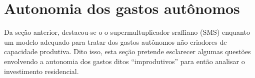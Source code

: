 \section{Autonomia dos gastos autônomos}\label{Literatura}

Da seção anterior, destacou-se o o supermultuplicador sraffiano (SMS) enquanto um modelo adequado para tratar dos gastos autônomos não criadores de capacidade produtiva.
Dito isso, esta seção pretende esclarecer algumas questões envolvendo a autonomia dos gastos ditos ``improdutivos'' para então analisar o investimento residencial.





\begin{comment}
DESCARTADOS

Além disso, a inclusão deste componente de gasto revela a resolução parcial da instabilidade harrodiana\footnote{Diferentemente de \textcite{hein_harrodian_2012}, a instabilidade harrodiana é entendida como a incapacidade das expectativas sobre o grau de utilização se ajustarem na direção correta (instabilidade fundamental nos termos de \textcite{serrano_trouble_2017}) e não como o princípio do ajuste do estoque de capital.} nos modelos kaleckianos se não forem feitas modificações adicionais\footnote{Como visto, nos modelos mais convencionais a endogeneidade do grau de utilização é suficiente para contornar esse problema. As complicações mencionadas, decorrem das sofisticações dos modelos kaleckianos.}.
Considerando, como em \textcite{amadeo_expectations_1987}, que o investimento reaja às expectativas sobre o grau de utilização ($u^e$), a função de acumulação ($g_I$) pode ser reescrita como:

\begin{equation}
\label{Kalecki_Autonomous}
g_I = \gamma + \gamma_u (u^e - u_n)
\end{equation}
em que $\gamma$ corresponde ao componente autônomo do investimento e pode ser traduzido tanto como \textit{animal spirits} quanto expectativa média da taxa de crescimento de longo prazo \cite[p.~4]{allain_macroeconomic_2014}. A justificativa da mudança da função de acumulação é por permitir tornar explícito o princípio do ajuste do estoque de capital no longo prazo. Como visto, no curto prazo o grau de utilização não é necessariamente igual ao desejado. No entanto, se as firmas ajustam o estoque de capital, 
$$
\Delta g_i = \varphi (u^e - u_n) \hspace{2cm} \varphi > 0
$$
tais expectativas devem ser revistas:


\end{comment}
